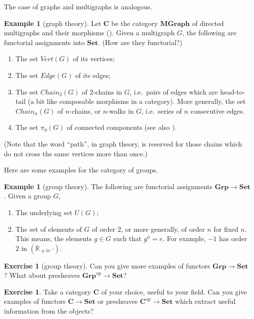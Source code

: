 \documentclass[12pt,oneside,headings=small]{scrbook}
\numberwithin{equation}{section}
\theoremstyle{plain}
\theoremstyle{definition}
\newtheorem{eg}[thm]{Example}
\newtheorem{ex}[thm]{Exercise}
\newcommand{\R}{\mathbb{R}}
\newcommand{\cat}[1]{{\mathbf{#1}}} %
\newcommand{\op}{\mathrm{op}} %
\newcommand{\Set}{\cat{Set}}
\newcommand{\Grp}{\cat{Grp}}
\DeclareMathOperator{\1}{\mathbbm{1}}
\DeclareMathOperator{\2}{\mathbbm{2}}
\begin{document}
The case of graphs and multigraphs is analogous.
\begin{eg}[graph theory]\label{graphtoset}
 Let $\cat{C}$ be the category $\cat{MGraph}$ of directed multigraphs and their morphisms (). Given a multigraph $G$, the following are functorial assignments into $\Set$. (How are they functorial?)
 \begin{enumerate}
  \item The set $\mathit{Vert}(G)$ of its vertices;
  \item The set $\mathit{Edge}(G)$ of its edges;
  \item The set $\mathit{Chain}_2(G)$ of 2-chains in $G$, i.e.~pairs of edges which are head-to-tail (a bit like composable morphisms in a category). More generally, the set $\mathit{Chain}_n(G)$ of $n$-chains, or $n$-walks in $G$, i.e.~series of $n$ consecutive edges.
  \item The set $\pi_0(G)$ of connected components (see also ).
 \end{enumerate}
 (Note that the word ``path'', in graph theory, is reserved for those chains which do not cross the same vertices more than once.)
\end{eg}

Here are some examples for the category of groups.
\begin{eg}[group theory]\label{grptoset}
 The following are functorial assignments $\Grp\to\Set$. Given a group $G$,
 \begin{enumerate}
  \item The underlying set $U(G)$;
  \item The set of elements of $G$ of order $2$, or more generally, of order $n$ for fixed $n$. This means, the elements $g\in G$ such that $g^n=e$. For example, $-1$ has order $2$ in $(\R_{\ne 0},\cdot)$.
 \end{enumerate}
\end{eg}

\begin{ex}[group theory]
 Can you give more examples of functors $\Grp\to\Set$? What about presheaves $\Grp^\op\to\Set$?
\end{ex}

\begin{ex}\label{yourcatset}
 Take a category $\cat{C}$ of your choice, useful to your field. Can you give examples of functors $\cat{C}\to\Set$ or presheaves $\cat{C}^\op\to\Set$ which extract useful information from the objects?
\end{ex}
\end{document}
